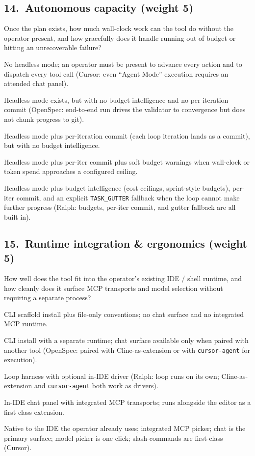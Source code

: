 \subsection*{14.\ Autonomous capacity (weight 5)}
Once the plan exists, how much wall-clock work can the tool do without
the operator present, and how gracefully does it handle running out of
budget or hitting an unrecoverable failure?
\begin{description}[leftmargin=11mm, labelindent=0mm]
\item[1] No headless mode; an operator must be present to advance
every action and to dispatch every tool call (Cursor: even
``Agent Mode'' execution requires an attended chat panel).
\item[2] Headless mode exists, but with no budget intelligence and no
per-iteration commit (OpenSpec: end-to-end run drives the validator
to convergence but does not chunk progress to git).
\item[3] Headless mode plus per-iteration commit (each loop iteration
lands as a commit), but with no budget intelligence.
\item[4] Headless mode plus per-iter commit plus soft budget warnings
when wall-clock or token spend approaches a configured ceiling.
\item[5] Headless mode plus budget intelligence (cost ceilings,
sprint-style budgets), per-iter commit, and an explicit
\texttt{TASK\_GUTTER} fallback when the loop cannot make further
progress (Ralph: budgets, per-iter commit, and gutter fallback are
all built in).
\end{description}

\subsection*{15.\ Runtime integration \& ergonomics (weight 5)}
How well does the tool fit into the operator's existing IDE / shell
runtime, and how cleanly does it surface MCP transports and model
selection without requiring a separate process?
\begin{description}[leftmargin=11mm, labelindent=0mm]
\item[1] CLI scaffold install plus file-only conventions; no chat
surface and no integrated MCP runtime.
\item[2] CLI install with a separate runtime; chat surface available
only when paired with another tool (OpenSpec: paired with
Cline-as-extension or with \texttt{cursor-agent} for execution).
\item[3] Loop harness with optional in-IDE driver (Ralph: loop runs
on its own; Cline-as-extension and \texttt{cursor-agent} both
work as drivers).
\item[4] In-IDE chat panel with integrated MCP transports; runs
alongside the editor as a first-class extension.
\item[5] Native to the IDE the operator already uses; integrated MCP
picker; chat is the primary surface; model picker is one click;
slash-commands are first-class (Cursor).
\end{description}

